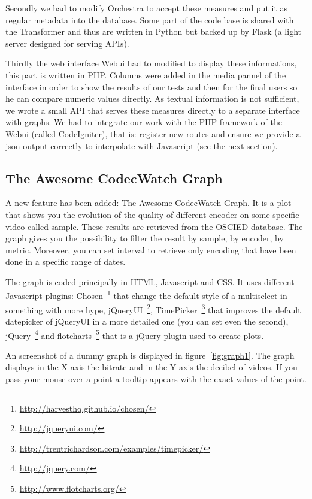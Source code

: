 \documentclass[a4paper,12pt]{article}
\begin{document}
Secondly we had to modify Orchestra to accept these measures and put it as
regular metadata into the database. Some part of the code base is shared with
the Transformer and thus are written in Python but backed up by Flask (a light
server designed for serving APIs).

Thirdly the web interface Webui had to modified to display these informations,
this part is written in PHP.  Columns were added in the media pannel of the
interface in order to show the results of our tests and then for the final users
so he can compare numeric values directly.  As textual information is not
sufficient, we wrote a small API that serves these measures directly to a
separate interface with graphs.  We had to integrate our work with the PHP
framework of the Webui (called CodeIgniter), that is: register new routes and
ensure we provide a json output correctly to interpolate with Javascript (see
the next section).

\subsection{The Awesome CodecWatch Graph}
A new feature has been added: The Awesome CodecWatch Graph. It is a plot that shows you the evolution of the quality of different encoder on some specific video called sample. These results are retrieved from the OSCIED database. The graph gives you the possibility to filter the result by sample, by encoder, by metric. Moreover, you can set interval to retrieve only encoding that have been done in a specific range of dates.

The graph is coded principally in HTML, Javascript and CSS. It uses different Javascript plugins: Chosen~\footnote{\url{http://harvesthq.github.io/chosen/}} that change the default style of a multiselect in something with more hype, jQueryUI~\footnote{\url{http://jqueryui.com/}}, TimePicker~\footnote{\url{http://trentrichardson.com/examples/timepicker/}} that improves the default datepicker of jQueryUI in a more detailed one (you can set even the second), jQuery~\footnote{\url{http://jquery.com/}} and flotcharts~\footnote{\url{http://www.flotcharts.org/}} that is a jQuery plugin used to create plots.

An screenshot of a dummy graph is displayed in figure~\ref{fig:graph1}. The graph displays in the X-axis the bitrate and in the Y-axis the decibel of videos. If you pass your mouse over a point a tooltip appears with the exact values of the point.
\end{document}
